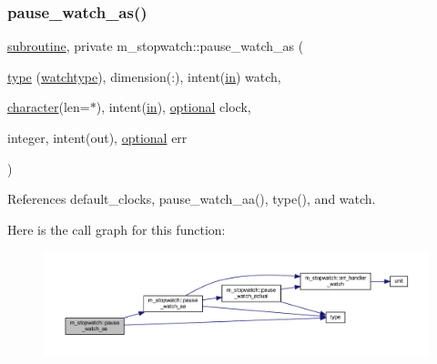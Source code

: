 \subsubsection{\texorpdfstring{pause\+\_\+watch\+\_\+as()}{pause\_watch\_as()}}
{\footnotesize\ttfamily \hyperlink{M__stopwatch_83_8txt_acfbcff50169d691ff02d4a123ed70482}{subroutine}, private m\+\_\+stopwatch\+::pause\+\_\+watch\+\_\+as (\begin{DoxyParamCaption}\item[{\hyperlink{stop__watch_83_8txt_a70f0ead91c32e25323c03265aa302c1c}{type} (\hyperlink{structm__stopwatch_1_1watchtype}{watchtype}), dimension(\+:), intent(\hyperlink{M__journal_83_8txt_afce72651d1eed785a2132bee863b2f38}{in})}]{watch,  }\item[{\hyperlink{option__stopwatch_83_8txt_abd4b21fbbd175834027b5224bfe97e66}{character}(len=$\ast$), intent(\hyperlink{M__journal_83_8txt_afce72651d1eed785a2132bee863b2f38}{in}), \hyperlink{option__stopwatch_83_8txt_aa4ece75e7acf58a4843f70fe18c3ade5}{optional}}]{clock,  }\item[{integer, intent(out), \hyperlink{option__stopwatch_83_8txt_aa4ece75e7acf58a4843f70fe18c3ade5}{optional}}]{err }\end{DoxyParamCaption})\hspace{0.3cm}{\ttfamily [private]}}



References default\+\_\+clocks, pause\+\_\+watch\+\_\+aa(), type(), and watch.

Here is the call graph for this function\+:
\nopagebreak
\begin{figure}[H]
\begin{center}
\leavevmode
\includegraphics[width=350pt]{namespacem__stopwatch_a7e89d5f8738809ee67019645810aa9d5_cgraph}
\end{center}
\end{figure}
\mbox{\label{namespacem__stopwatch_aaba5f0339d92da284d233dcb2f4d083a}} 
